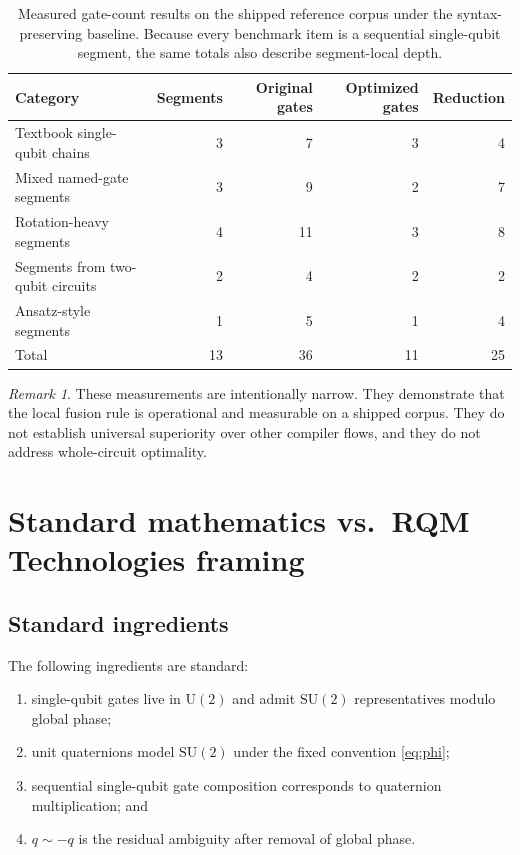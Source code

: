 \documentclass[11pt]{article}
\theoremstyle{remark}
\newtheorem{remark}[definition]{Remark}
\newcommand{\SU}{\mathrm{SU}}
\newcommand{\U}{\mathrm{U}}
\begin{document}
\begin{table}[h]
\centering
\begin{tabular}{@{}lrrrr@{}}
\toprule
Category & Segments & Original gates & Optimized gates & Reduction \\
\midrule
Textbook single-qubit chains & 3 & 7 & 3 & 4 \\
Mixed named-gate segments & 3 & 9 & 2 & 7 \\
Rotation-heavy segments & 4 & 11 & 3 & 8 \\
Segments from two-qubit circuits & 2 & 4 & 2 & 2 \\
Ansatz-style segments & 1 & 5 & 1 & 4 \\
\midrule
Total & 13 & 36 & 11 & 25 \\
\bottomrule
\end{tabular}
\caption{Measured gate-count results on the shipped reference corpus under the
syntax-preserving baseline. Because every benchmark item is a sequential
single-qubit segment, the same totals also describe segment-local depth.}
\label{tab:category-results}
\end{table}

\begin{remark}
These measurements are intentionally narrow. They demonstrate that the local
fusion rule is operational and measurable on a shipped corpus. They do not
establish universal superiority over other compiler flows, and they do not
address whole-circuit optimality.
\end{remark}

\section{Standard mathematics vs.\ RQM Technologies framing}

\subsection{Standard ingredients}

The following ingredients are standard:
\begin{enumerate}[label=(\arabic*), leftmargin=1.5em]
\item single-qubit gates live in $\U(2)$ and admit $\SU(2)$ representatives
modulo global phase;
\item unit quaternions model $\SU(2)$ under the fixed convention \eqref{eq:phi};
\item sequential single-qubit gate composition corresponds to quaternion
multiplication; and
\item $q\sim -q$ is the residual ambiguity after removal of global phase.
\end{enumerate}
\end{document}
